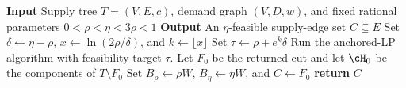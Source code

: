 \begin{algorithm}[tbp]
    \DontPrintSemicolon
    \caption{Hybrid LP-separator recursion}\label{alg:hybrid-lp-centroid}
    \textbf{Input} Supply tree $T=(V,E,c)$, demand graph $(V,D,w)$, and fixed rational parameters $0<\rho<\eta<3\rho<1$\;
    \textbf{Output} An $\eta$-feasible supply-edge set $C\subseteq E$\;
    Set $\delta\gets\eta-\rho$, $x\gets\ln(2\rho/\delta)$, and $k\gets\lfloor x\rfloor$\;
    Set $\tau\gets\rho+e^k\delta$\;
    Run the anchored-LP algorithm with feasibility target $\tau$. Let $F_0$ be the returned cut and let $\cH_0$ be the components of $T\setminus F_0$\;
    Set $B_\rho\gets\rho W$, $B_\eta\gets\eta W$, and $C\gets F_0$\;
    \textbf{return} $C$\;
\end{algorithm}